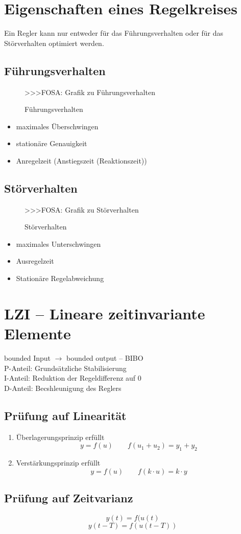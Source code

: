 \section{Eigenschaften eines Regelkreises}
Ein Regler kann nur entweder für das Führungsverhalten oder für das 
Störverhalten optimiert werden. 

\subsection{Führungsverhalten}
\begin{figure}[h!]
    \centering
    >>>FOSA: Grafik zu Führungsverhalten
    \caption{Führungsverhalten}
    \label{fig:fhr}
\end{figure}
\begin{itemize}
  \item maximales Überschwingen
  \item stationäre Genauigkeit
  \item Anregelzeit (Anstiegszeit (Reaktionszeit))
\end{itemize}

\subsection{Störverhalten}
\begin{figure}[h!]
    \centering
    >>>FOSA: Grafik zu Störverhalten
    \caption{Störverhalten}
    \label{fig:str}
\end{figure}
\begin{itemize}
  \item maximales Unterschwingen
  \item Ausregelzeit
  \item Stationäre Regelabweichung
\end{itemize}

\section{LZI -- Lineare zeitinvariante Elemente}
bounded Input $\rightarrow$ bounded output -- BIBO\\
P-Anteil: Grundsätzliche Stabilisierung \\
I-Anteil: Reduktion der Regeldifferenz auf 0 \\
D-Anteil: Becshleunigung des Reglers

\subsection{Prüfung auf Linearität}
\begin{enumerate}
  \item Überlagerungsprinzip erfüllt 
        \[ y = f(u) \qquad f(u_1 + u_2) = y_1 + y_2 \]
  \item Verstärkungsprinzip erfüllt
        \[ y = f(u) \qquad f(k \cdot u) = k \cdot y \]
\end{enumerate}

\subsection{Prüfung auf Zeitvarianz}
\[ y(t) = f(u(t) \]
\[ y(t - T) = f(u(t - T)) \]

\[ \boxed{} \]
\[ \boxed{} \]